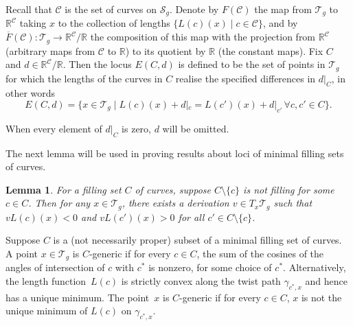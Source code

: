 \documentclass[pdftex]{sigma}
\numberwithin{equation}{section}
\newtheorem{Lemma}[Theorem]{Lemma}
\begin{document}
Recall that $\mathcal{C}$ is the set of curves on $\mathcal{S}_{g}$. Denote by $F(\mathcal{C})$ the map from $\mathcal{T}_{g}$ to $\mathbb{R}^{\mathcal{C}}$ taking $x$ to the collection of lengths $\{L(c)(x) \mid c\in \mathcal{C}\}$, and by $\overline{F}(\mathcal{C})\colon\mathcal{T}_{g}\rightarrow \mathbb{R}^{\mathcal{C}}/\mathbb{R}$ the composition of this map with the projection from $\mathbb{R}^{\mathcal{C}}$ (arbitrary maps from $\mathcal{C}$ to $\mathbb{R}$) to its quotient by $\mathbb{R}$ (the constant maps). Fix $C$ and $d\in \mathbb{R}^{\mathcal{C}}/\mathbb{R}$. Then the locus $E(C,d)$ is defined to be the set of points in $\mathcal{T}_{g}$ for which the lengths of the curves in $C$ realise the specified differences in $d|_{C}$, in other words
\begin{equation}
\label{withd}
E(C,d)=\{x\in \mathcal{T}_{g} \mid L(c)(x)+d|_{c}=L(c')(x)+d|_{c'} \, \forall c,c'\in C\}.
\end{equation}

When every element of $d|_{C}$ is zero, $d$ will be omitted.

The next lemma will be used in proving results about loci of minimal filling sets of curves.

\begin{Lemma}\label{LipschitzMap}
For a filling set $C$ of curves, suppose $C\setminus \{c\}$ is not filling for some $c\in C$. Then for any $x\in \mathcal{T}_{g}$, there exists a derivation $v\in T_{x}\mathcal{T}_{g}$ such that $vL(c)(x)<0$ and $vL(c')(x)>0$ for all $c'\in C\setminus \{c\}$.
\end{Lemma}

\begin{Definition}[$C$-generic]
Suppose $C$ is a (not necessarily proper) subset of a minimal filling set of curves. A point $x\in \mathcal{T}_{g}$ is $C$-generic if for every $c\in C$, the sum of the cosines of the angles of intersection of $c$ with $c^{*}$ is nonzero, for some choice of $c^{*}$. Alternatively, the length function~$L(c)$ is strictly convex along the twist path $\gamma_{c^{*},x}$ and hence has a unique minimum. The point~$x$ is $C$-generic if for every $c\in C$, $x$ is not the unique minimum of $L(c)$ on $\gamma_{c^{*},x}$.
\end{Definition}
\end{document}
